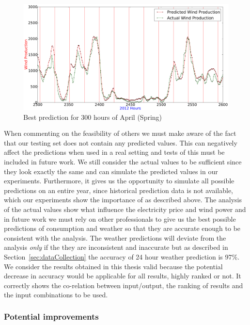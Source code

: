 \begin{figure}[H]
\centering
\includegraphics[width=0.99\linewidth]{billeder/bestPossiblePredictionWindProduction2300-2600_April_Spring.png}
\caption{Best prediction for 300 hours of April (Spring)}
\label{fig:bestWPPredictSpringForDiscussion}
\end{figure}

When commenting on the feasibility of others we must make aware of the fact that our testing set does not contain any predicted values. This can negatively affect the predictions when used in a real setting and tests of this must be included in future work. We still consider the actual values to be sufficient since they look exactly the same and can simulate the predicted values in our experiments. Furthermore, it gives us the opportunity to simulate all possible predictions on an entire year, since historical prediction data is not available, which our experiments show the importance of as described above. The analysis of the actual values show what influence the electricity price and wind power and in future work we must rely on other professionals to give us the best possible predictions of consumption and weather so that they are accurate enough to be consistent with the analysis. The weather predictions will deviate from the analysis \emph{only} if the they are inconsistent and inaccurate but as described in Section~\ref{sec:dataCollection} the accuracy of 24 hour weather prediction is 97\%. We consider the results obtained in this thesis valid because the potential decrease in accuracy would be applicable for all results, highly ranked or not. It correctly shows the co-relation between input/output, the ranking of results and the input combinations to be used.

\subsubsection{Potential improvements}

